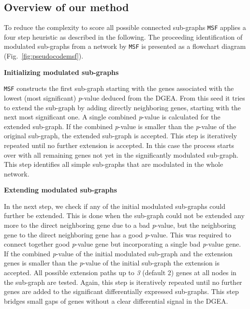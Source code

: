 \documentclass[10pt,a4paper,twocolumn]{article}
\begin{document}
	\subsection*{Overview of our method}
	
	To reduce the complexity to score all possible connected sub-graphs
	\texttt{MSF} applies a four step heuristic as described in the
	following. The proceeding identification of modulated sub-graphs from a
	network by \texttt{MSF} is presented as a flowchart diagram
	(Fig.~\ref{fig:pseudocodemsf}). \newline
	
	
	
	\textbf{Initializing modulated sub-graphs}
	
	\texttt{MSF} constructs the first sub-graph starting with the genes
	associated with the lowest (most significant) \textit{p}-value deduced from
	the DGEA. From this seed it tries to extend the sub-graph by adding directly
	neighboring genes, starting with the next most significant one. A single
	combined \textit{p}-value is calculated for the extended sub-graph.
	If the combined \textit{p}-value is smaller than the \textit{p}-value of
	the original sub-graph,
	the extended sub-graph is accepted. This step is
	iteratively repeated until no further extension is accepted. In this case
	the process starts over with all remaining genes not yet in the significantly
	modulated sub-graph. This step identifies all simple sub-graphs that
	are modulated in the whole network.\newline
	
	\textbf{Extending modulated sub-graphs}
	
	In the next step, we check if any of the initial modulated sub-graphs 
	could further be extended. This is done when the sub-graph could not be extended any more to the direct neighboring gene due to a bad \textit{p}-value, but the neighboring gene to the direct neighboring gene has a good \textit{p}-value. This was required to connect together good \textit{p}-value gene but incorporating a single bad \textit{p}-value gene. If the combined \textit{p}-value of the initial modulated sub-graph and the extension genes is smaller than the \textit{p}-value of the initial sub-graph the extension is accepted. All possible extension paths up to \emph{3} (default 2) genes at
	all nodes in the sub-graph are tested. Again, this step is iteratively repeated until
	no further genes are added to the significant differentially expressed
	sub-graphs. This step bridges small gaps of genes without a clear
	differential signal in the DGEA.\newline
	
\end{document}
